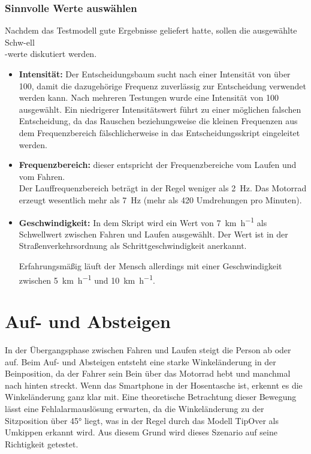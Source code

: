\subsubsection{Sinnvolle Werte auswählen}
Nachdem das Testmodell gute Ergebnisse geliefert hatte, sollen die ausgewählte Schw-ell\\-werte diskutiert werden.
\begin{itemize}
	\item \textbf{Intensität:} Der Entscheidungsbaum sucht nach einer Intensität von über 100, damit die dazugehörige Frequenz zuverlässig zur Entscheidung verwendet werden kann. Nach mehreren Testungen wurde eine Intensität von 100 ausgewählt. Ein niedrigerer Intensitätswert führt zu einer möglichen falschen Entscheidung, da das Rauschen beziehungsweise die kleinen Frequenzen aus dem Frequenzbereich fälschlicherweise in das Entscheidungsskript eingeleitet werden.
	\item \textbf{Frequenzbereich:} dieser entspricht der Frequenzbereiche vom Laufen und vom Fahren.\\
	Der Lauffrequenzbereich beträgt in der Regel weniger als \SI{2}{\hertz}. Das Motorrad erzeugt wesentlich mehr als \SI{7}{\hertz} (mehr als 420 Umdrehungen pro Minuten). 
	\item \textbf{Geschwindigkeit:} In dem Skript wird ein Wert von \SI[per-mode = symbol]{7}{\kilo\meter\per\hour} als Schwellwert zwischen Fahren und Laufen ausgewählt. Der Wert ist in der Straßenverkehrsordnung als Schrittgeschwindigkeit anerkannt\citep{Bussgeldkataloge2022}. 
	
	Erfahrungsmäßig läuft der Mensch allerdings mit einer Geschwindigkeit zwischen \SI[per-mode = symbol]{5}{\kilo\meter\per\hour} und \SI[per-mode = symbol]{10}{\kilo\meter\per\hour}.
\end{itemize}



\section{Auf- und Absteigen} \label{sec:AufAbsteigen}
In der Übergangsphase zwischen Fahren und Laufen steigt die Person ab oder auf. Beim Auf- und Absteigen entsteht eine starke Winkeländerung in der Beinposition, da der Fahrer sein Bein über das Motorrad hebt und manchmal nach hinten streckt. Wenn das Smartphone in der Hosentasche ist, erkennt es die Winkeländerung ganz klar mit.
Eine theoretische Betrachtung dieser Bewegung lässt eine Fehlalarmauslösung erwarten, da die Winkeländerung zu der Sitzposition über \ang{45} liegt, was in der Regel durch das Modell \glqq TipOver\grqq{} als Umkippen erkannt wird.
Aus diesem Grund wird dieses Szenario auf seine Richtigkeit getestet.

